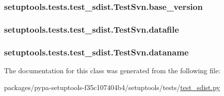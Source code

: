\subsubsection[{base\+\_\+version}]{\setlength{\rightskip}{0pt plus 5cm}setuptools.\+tests.\+test\+\_\+sdist.\+Test\+Svn.\+base\+\_\+version}\label{classsetuptools_1_1tests_1_1test__sdist_1_1TestSvn_ad566b4838af512339f679d13dfe56157}
\hypertarget{classsetuptools_1_1tests_1_1test__sdist_1_1TestSvn_afd855a73b3bb649f6f60bd5daff52f7c}{}
\subsubsection[{datafile}]{\setlength{\rightskip}{0pt plus 5cm}setuptools.\+tests.\+test\+\_\+sdist.\+Test\+Svn.\+datafile}\label{classsetuptools_1_1tests_1_1test__sdist_1_1TestSvn_afd855a73b3bb649f6f60bd5daff52f7c}
\hypertarget{classsetuptools_1_1tests_1_1test__sdist_1_1TestSvn_a2e3ee02698733c2f176f28a25001f178}{}
\subsubsection[{dataname}]{\setlength{\rightskip}{0pt plus 5cm}setuptools.\+tests.\+test\+\_\+sdist.\+Test\+Svn.\+dataname}\label{classsetuptools_1_1tests_1_1test__sdist_1_1TestSvn_a2e3ee02698733c2f176f28a25001f178}


The documentation for this class was generated from the following file\+:\begin{DoxyCompactItemize}
\item 
packages/pypa-\/setuptools-\/f35c107404b4/setuptools/tests/\hyperlink{test__sdist_8py}{test\+\_\+sdist.\+py}\end{DoxyCompactItemize}
